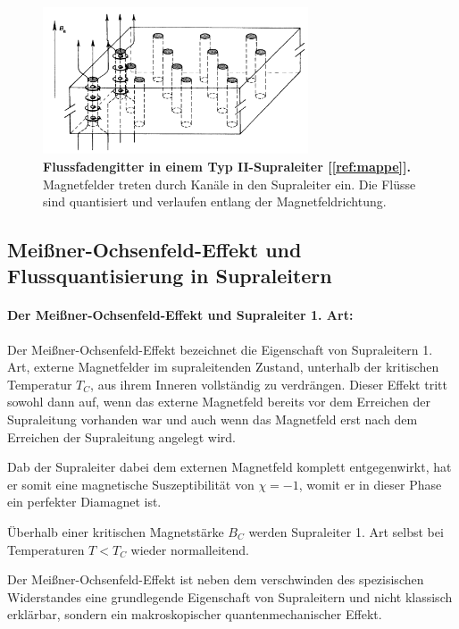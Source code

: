\documentclass[a4paper,ngerman]{scrartcl}
\begin{document}
\begin{figure}[tb!]
\centering
\includegraphics[width=0.7\textwidth]{abbildungen/typ2_supraleiter.png}
\caption[Versuchsplatz]{\textbf{Flussfadengitter in einem Typ II-Supraleiter [\ref{ref:mappe}].} Magnetfelder treten durch Kanäle in den Supraleiter ein. Die Flüsse sind quantisiert und verlaufen entlang der Magnetfeldrichtung.}
\label{fig:typII}
\end{figure}


\subsection{Meißner-Ochsenfeld-Effekt und Flussquantisierung in Supraleitern}
\label{ssec:meissner}
\paragraph{Der Meißner-Ochsenfeld-Effekt und Supraleiter 1. Art:}
Der Meißner-Ochsenfeld-Effekt bezeichnet die Eigenschaft von
Supraleitern 1. Art, externe Magnetfelder im supraleitenden Zustand,
unterhalb der kritischen Temperatur $T_C$,
aus ihrem Inneren vollständig zu verdrängen. Dieser Effekt tritt
sowohl dann auf, wenn das externe Magnetfeld bereits vor dem Erreichen
der Supraleitung vorhanden war und auch wenn das Magnetfeld erst nach
dem Erreichen der Supraleitung angelegt wird.

Dab der Supraleiter dabei dem externen Magnetfeld komplett
entgegenwirkt, hat er somit eine magnetische Suszeptibilität von $\chi
= -1$, womit er in dieser Phase ein perfekter Diamagnet ist. 

Überhalb einer kritischen Magnetstärke $B_C$ werden Supraleiter 1. Art
selbst bei Temperaturen $T < T_C$ wieder normalleitend.

Der Meißner-Ochsenfeld-Effekt ist neben dem verschwinden des
spezisischen Widerstandes eine grundlegende Eigenschaft von
Supraleitern und nicht klassisch erklärbar, sondern ein
makroskopischer quantenmechanischer Effekt. 
\end{document}
